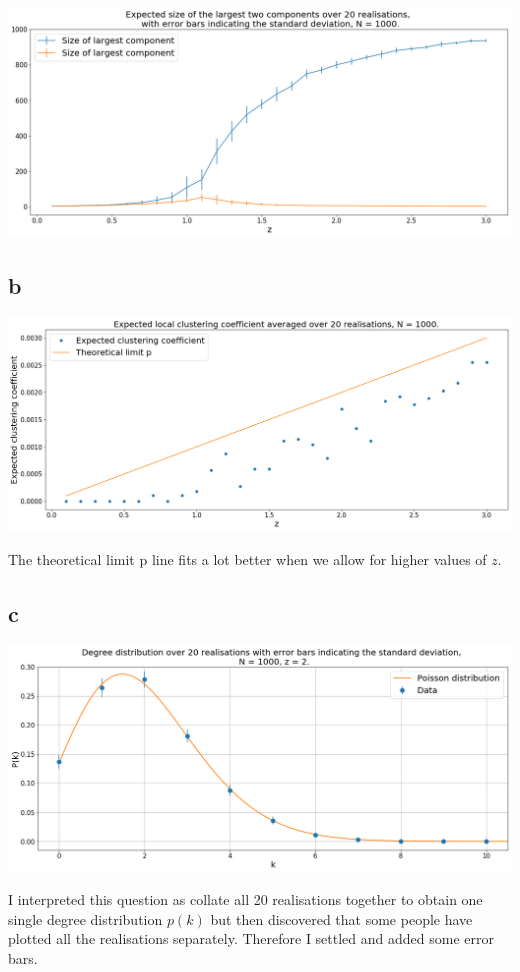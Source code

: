 \documentclass[12pt, twoside, a4paper]{article}
\begin{document}
\includegraphics[width = 170mm]{lc1000}

\subsection*{b}
\includegraphics[width = 170mm]{clustering}

The theoretical limit p line fits a lot better when we allow for higher values of $z$. 

\subsection*{c}
\includegraphics[width = 170mm]{degreedistribution}

I interpreted this question as collate all 20 realisations together to obtain one single degree distribution $p(k)$ but then discovered that some people have plotted all the realisations separately. Therefore I settled and added some error bars. 
\end{document}
